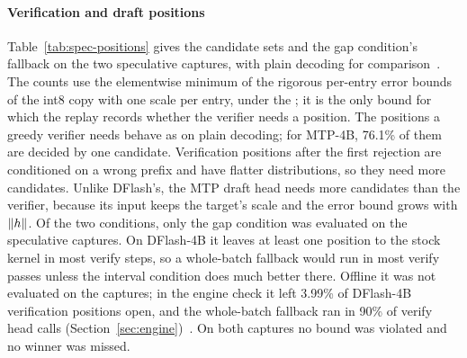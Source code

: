 \paragraph{Verification and draft positions} Table~\ref{tab:spec-positions} gives the candidate sets and the gap condition's fallback on the two speculative captures, with plain decoding for comparison~. The counts use the elementwise minimum of the rigorous per-entry error bounds of the int8 copy with one scale per entry, under the \modelcons{}; it is the only bound for which the replay records whether the verifier needs a position. The positions a greedy verifier needs behave as on plain decoding; for MTP-4B, 76.1\% of them are decided by one candidate. Verification positions after the first rejection are conditioned on a wrong prefix and have flatter distributions, so they need more candidates. Unlike DFlash's, the MTP draft head needs more candidates than the verifier, because its input keeps the target's scale and the error bound grows with $\lVert h\rVert$. Of the two \Rstock{} conditions, only the gap condition was evaluated on the speculative captures. On DFlash-4B it leaves at least one position to the stock kernel in most verify steps, so a whole-batch fallback would run in most verify passes unless the interval condition does much better there. Offline it was not evaluated on the captures; in the engine check it left 3.99\% of DFlash-4B verification positions open, and the whole-batch fallback ran in 90\% of verify head calls (Section~\ref{sec:engine})~. On both captures no bound was violated and no winner was missed.

